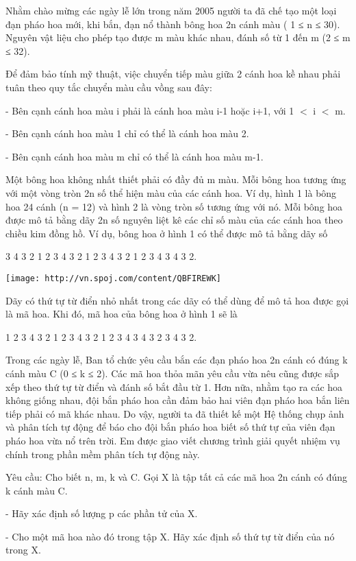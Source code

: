 Nhằm chào mừng các ngày lễ lớn trong năm 2005 người ta đã chế tạo một loại đạn pháo hoa mới, khi bắn, đạn nổ thành bông hoa 2n cánh màu ( 1 ≤ n ≤ 30). Nguyên vật liệu cho phép tạo được m màu khác nhau, đánh số từ 1 đến m (2 ≤ m ≤ 32).

Để đảm bảo tính mỹ thuật, việc chuyển tiếp màu giữa 2 cánh hoa kề nhau phải tuân theo quy tắc chuyển màu cầu vồng sau đây:

- Bên cạnh cánh hoa màu i phải là cánh hoa màu i-1 hoặc i+1, với 1 $<$ i $<$ m.

- Bên cạnh cánh hoa màu 1 chỉ có thể là cánh hoa màu 2.

- Bên cạnh cánh hoa màu m chỉ có thể là cánh hoa màu m-1.

Một bông hoa không nhất thiết phải có đầy đủ m màu. Mỗi bông hoa tương ứng với một vòng tròn 2n số thể hiện màu của các cánh hoa. Ví dụ, hình 1 là bông hoa 24 cánh (n = 12) và hình 2 là vòng tròn số tương ứng với nó. Mỗi bông hoa được mô tả bằng dãy 2n số nguyên liệt kê các chỉ số màu của các cánh hoa theo chiều kim đồng hồ. Ví dụ, bông hoa ở hình 1 có thể được mô tả bằng dãy số

3 4 3 2 1 2 3 4 3 2 1 2 3 4 3 2 1 2 3 4 3 4 3 2.


\texttt{[image: http://vn.spoj.com/content/QBFIREWK]}

Dãy có thứ tự từ điển nhỏ nhất trong các dãy có thể dùng để mô tả hoa được gọi là mã hoa. Khi đó, mã hoa của bông hoa ở hình 1 sẽ là

1 2 3 4 3 2 1 2 3 4 3 2 1 2 3 4 3 4 3 2 3 4 3 2.

Trong các ngày lễ, Ban tổ chức yêu cầu bắn các đạn pháo hoa 2n cánh có đúng k cánh màu C (0 ≤ k ≤ 2). Các mã hoa thỏa mãn yêu cầu vừa nêu cũng được sắp xếp theo thứ tự từ điển và đánh số bắt đầu từ 1. Hơn nữa, nhằm tạo ra các hoa không giống nhau, đội bắn pháo hoa cần đảm bảo hai viên đạn pháo hoa bắn liên tiếp phải có mã khác nhau. Do vậy, người ta đã thiết kế một Hệ thống chụp ảnh và phân tích tự động để báo cho đội bắn pháo hoa biết số thứ tự của viên đạn pháo hoa vừa nổ trên trời. Em được giao viết chương trình giải quyết nhiệm vụ chính trong phần mềm phân tích tự động này.

Yêu cầu: Cho biết n, m, k và C. Gọi X là tập tất cả các mã hoa 2n cánh có đúng k cánh màu C.

- Hãy xác định số lượng p các phần tử của X.

- Cho một mã hoa nào đó trong tập X. Hãy xác định số thứ tự từ điển của nó trong X.